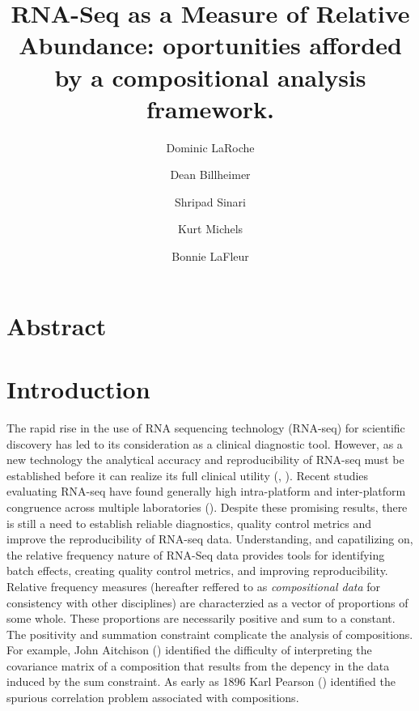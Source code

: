 \documentclass{article}\usepackage[]{graphicx}\usepackage[]{color}
\title{RNA-Seq as a Measure of Relative Abundance: oportunities afforded by a compositional analysis framework.}
\author{Dominic LaRoche \and Dean Billheimer \and Shripad Sinari \and Kurt Michels \and  Bonnie LaFleur}
\begin{document}
\maketitle

\doublespacing
\section{Abstract}


\section{Introduction}

The rapid rise in the use of RNA sequencing technology (RNA-seq) for scientific discovery has led to its consideration as a clinical diagnostic tool.  However, as a new technology the analytical accuracy and reproducibility of RNA-seq must be established before it can realize its full clinical utility (\cite{SEQC/MAQC-IIIConsortium2014}, \cite{VanKeuren-Jensen2014}). Recent studies evaluating RNA-seq have found generally high intra-platform and inter-platform congruence across multiple laboratories (\cite{Li2013, tHoen2013, SEQC/MAQC-IIIConsortium2014}).  Despite these promising results, there is still a need to establish reliable diagnostics, quality control metrics and improve the reproducibility of RNA-seq data.  Understanding, and capatilizing on, the relative frequency nature of RNA-Seq data provides tools for identifying batch effects, creating quality control metrics, and improving reproducibility.\\


Relative frequency measures (hereafter reffered to as \emph{compositional data} for consistency with other disciplines) are characterzied as a vector of proportions of some whole.  These proportions are necessarily positive and sum to a constant.  The positivity and summation constraint complicate the analysis of compositions.  For example, John Aitchison (\cite{Aitchison1986}) identified the difficulty of interpreting the covariance matrix of a composition that results from the depency in the data induced by the sum constraint.  As early as 1896 Karl Pearson (\cite{Pearson1896}) identified the spurious correlation problem associated with compositions.  \\
\end{document}
